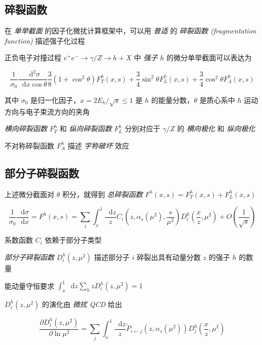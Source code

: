 \documentclass[oneside,a4paper,openany,11pt]{ctexbook}
\newcommand*{\dif}{\mathop{}\!\mathrm{d}} %
\begin{document}
\subsection{碎裂函数}

在 \emph{单举截面} 的因子化微扰计算框架中，可以用 \emph{普适} 的 \emph{碎裂函数 (fragmentation function)} 描述强子化过程

正负电子对撞过程 $e^+ e^- \to \gamma/Z \to h + X$ 中 \emph{强子} $h$ 的微分单举截面可以表达为

\begin{equation}
    \frac{1}{\sigma_0} \frac{\dif^2 \sigma}{\dif x \cos\theta} \frac{3}{8}(1+\cos^2 \theta) F_T^h (x, s) + \frac{3}{4} \sin^2 \theta F_L^h (x, s) + \frac{3}{4} \cos^2 \theta F_\Lambda^h (x, s)
\end{equation}

其中 $\sigma_0$ 是归一化因子，$x=2 E_h/\sqrt{s} \le 1$ 是 $h$ 的能量分数，$\theta$ 是质心系中 $h$ 运动方向与电子束流方向的夹角

\emph{横向碎裂函数} $F_T^h$ 和 \emph{纵向碎裂函数} $F_L^h$ 分别对应于 $\gamma/Z$ 的 \emph{横向极化} 和 \emph{纵向极化}

不对称碎裂函数 $F_A^h$ 描述 \emph{宇称破坏} 效应

\subsection{部分子碎裂函数}

上述微分截面对 $\theta$ 积分，就得到 \emph{总碎裂函数} $F^h(x, s)=F_T^h(x, s)+F_L^h(x, s)$

\begin{equation}
    \frac{1}{\sigma_0} \frac{\dif \sigma}{\dif x} = F^h(x, s) = \sum_i \int_x^1 \frac{\dif z}{z} C_i \left(z,\alpha_s(\mu^2),\frac{s}{\mu^2}\right) D_i^h \left(\frac{x}{z}, \mu^2\right) + O \left(\frac{1}{\sqrt{s}}\right)
\end{equation}

系数函数 $C_i$ 依赖于部分子类型

\emph{部分子碎裂函数} $D_i^h(z, \mu^2)$ 描述部分子 $i$ 碎裂出具有动量分数 $z$ 的强子 $h$ 的数量

能动量守恒要求 $\int_x^1 \dif z \sum_h z D_i^h (z, \mu^2)=1$

$D_i^h (z, \mu^2)$ 的演化由 \emph{微扰 QCD} 给出

\begin{equation}
    \frac{\partial D_i^h (z, \mu^2)}{\partial \ln \mu^2} = \sum_j \int_x^1 \frac{\dif z}{z} \tilde{P}_{i \gets j} (z, \alpha_s(\mu^2)) D_j^h \left(\frac{x}{z}, \mu^2\right)
\end{equation}
\end{document}
